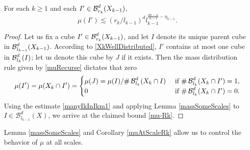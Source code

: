 \begin{corollary}\label{muAtScaleRk}
For each $k\geq 1$ and each $I' \in \operatorname{\mathcal{B}}^d_{r_k} (X_{k-1})$, 
	\begin{equation} 
	\mu(I') \lesssim (r_k/l_{k-1})^d l_{k-1}^{\frac{dn-\alpha}{n-1}-\eta_{k-1}}. \label{mu-Rk}
	\end{equation} 
\end{corollary}
\begin{proof}
Let us fix a cube $I' \in \operatorname{\mathcal{B}}^d_{r_k}(X_{k-1})$, and let $I$ denote its unique parent cube in $\operatorname{\mathcal{B}}_{l_{k-1}}^d (X_{k-1})$. According to \eqref{XkWellDistributed}, $I'$ contains at most one cube in $\operatorname{\mathcal{B}}_{l_k}^d(I)$; let us denote this cube by $J$ if it exists. Then the mass distribution rule given by \eqref{muRecurse} dictates that zero
\begin{align*}
\mu(I') = \mu(X_k \cap I') = \begin{cases} \mu(J) = {\mu(I)}/{\# \operatorname{\mathcal{B}}_{l_k}^d(X_k \cap I)}  &\text{ if } \# \operatorname{\mathcal{B}}_{l_k}^d(X_k \cap I') = 1, \\ 0 &\text{ if } \# \operatorname{\mathcal{B}}_{l_k}^d(X_k \cap I') = 0. \end{cases} 
\end{align*}
Using the estimate \eqref{manyIkInIkm1} and applying Lemma \ref{massSomeScales} to $I \in \mathcal B_{l_{k-1}}^d(X)$, we arrive at the claimed bound \eqref{mu-Rk}. 
\end{proof}
Lemma \ref{massSomeScales} and Corollary \ref{muAtScaleRk} allow us to control the behavior of $\mu$ at all scales. %

